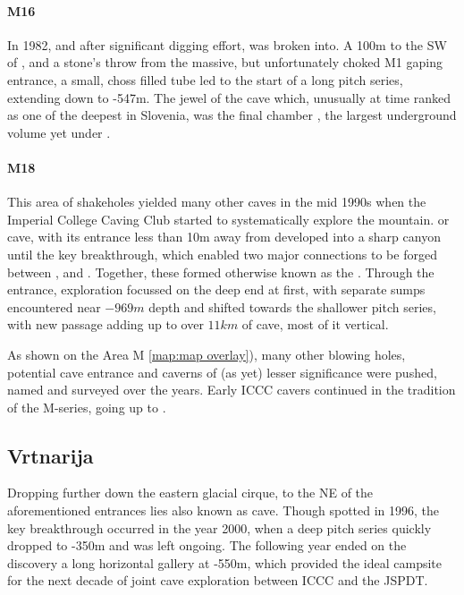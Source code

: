 \paragraph{M16} In 1982, and after significant digging effort,  was broken into. A 100m to the SW of , and a stone's throw from the massive, but unfortunately choked M1 gaping entrance, a small, choss filled tube led to the start of a long pitch series, extending down to -547m. The jewel of the cave which, unusually at time ranked as one of the deepest in Slovenia, was the final chamber , the largest underground volume yet under . 



\paragraph{M18} This area of shakeholes yielded many other caves in the mid 1990s when the Imperial College Caving Club started to systematically explore the mountain.  or  cave, with its entrance less than 10m away from  developed into a sharp canyon until the key  breakthrough, which enabled two major connections to be forged between ,  and . Together, these formed  otherwise known as the . Through the  entrance, exploration focussed on the deep end at first, with separate sumps encountered near $-969m$ depth and shifted towards the shallower pitch series, with new passage adding up to over $11km$ of cave, most of it vertical.

As shown on the Area M \vref{map:map overlay}), many other blowing holes, potential cave entrance and caverns of (as yet) lesser significance were pushed, named and surveyed over the years. Early ICCC cavers continued in the tradition of the M-series, going up to . 

\subsection{Vrtnarija} Dropping further down the eastern glacial cirque, to the NE of the aforementioned entrances lies  also known as   cave. Though spotted in 1996, the key breakthrough occurred in the year 2000, when a deep pitch series quickly dropped to -350m and was left ongoing. The following year ended on the discovery a long horizontal gallery at -550m, which provided the ideal campsite for the next decade of joint cave exploration between ICCC and the JSPDT. 

